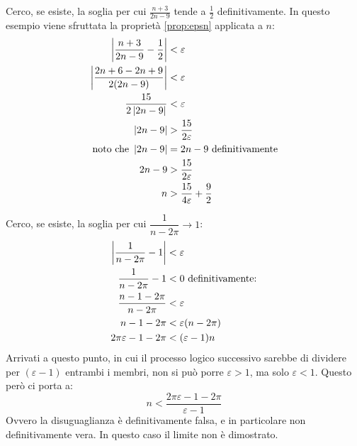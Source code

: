\begin{examp}
	Cerco, se esiste, la soglia per cui $\frac{n+3}{2n-9}$ tende a $\frac{1}{2}$ definitivamente. In questo esempio viene sfruttata la proprietà \ref{prop:epsn} applicata a $n$:
	\begin{align*}
		\left\lvert \frac{n+3}{2n-9}-\frac{1}{2} \right\rvert & <\varepsilon                         \\
		\left\lvert \frac{2n+6-2n+9}{2(2n-9)} \right\rvert    & <\varepsilon                         \\
		\frac{15}{2\left\lvert 2n-9 \right\rvert}             & <\varepsilon                         \\
		\left\lvert 2n-9 \right\rvert                         & >\frac{15}{2\varepsilon}             \\
		\text{noto che } \left\lvert 2n-9 \right\rvert        & = 2n-9 \text{ definitivamente}       \\
		2n-9                               & >\frac{15}{2\varepsilon}             \\
		n                                  & >\frac{15}{4\varepsilon}+\frac{9}{2}
	\end{align*}
\end{examp}
\begin{examp}
	Cerco, se esiste, la soglia per cui $\dfrac{1}{n-2\pi}\to 1$:
	\begin{align*}
		\left\lvert \frac{1}{n-2\pi}-1 \right\rvert & <\varepsilon                \\
		\frac{1}{n-2\pi}-1       & < 0\text{ definitivamente:} \\
		\frac{n-1-2\pi}{n-2\pi}  & <\varepsilon                \\
		n-1-2\pi                 & <\varepsilon(n-2\pi)        \\
		2\pi\varepsilon-1-2\pi   & <(\varepsilon-1)n
	\end{align*}
	Arrivati a questo punto, in cui il processo logico successivo sarebbe di dividere per $(\varepsilon-1)$ entrambi i membri, non si può porre $\varepsilon>1$, ma solo $\varepsilon<1$. Questo però ci porta a:
	\[
		n <\frac{2\pi\varepsilon-1-2\pi}{\varepsilon-1}
	\]
	Ovvero la disuguaglianza è definitivamente falsa, e in particolare non definitivamente vera. In questo caso il limite non è dimostrato.
\end{examp}


